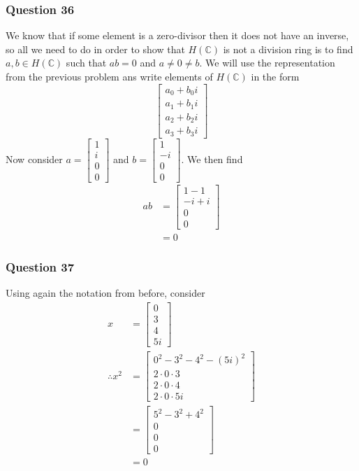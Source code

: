 \documentclass{article}
\begin{document}
\subsubsection{Question 36}
We know that if some element is a zero-divisor then it does not have an inverse, so all we need to do in order to show that $H(\mathbb C)$ is not a division ring is to find $a,b\in H(\mathbb C)$ such that $ab=0$ and $a\not=0\not=b$. We will use the representation from the previous problem ans write elements of $H(\mathbb C)$ in the form \[\left[\begin{matrix}
a_0+b_0i\\
a_1+b_1i\\
a_2+b_2i\\
a_3+b_3i
\end{matrix}\right]\] Now consider $a=\left[\begin{matrix}
1\\i\\0\\0
\end{matrix}\right]$ and $b=\left[\begin{matrix}
1\\-i\\0\\0
\end{matrix}\right]$. We then find 
\begin{align*}
ab&=\left[\begin{matrix}
1-1\\
-i+i\\
0\\
0
\end{matrix}\right]\\
&= 0
\end{align*}

\subsubsection{Question 37}

Using again the notation from before, consider
\begin{align*}
x &= \left[\begin{matrix}
0\\3\\4\\5i
\end{matrix}\right]\\
\therefore x^2&= \left[\begin{matrix}
0^2-3^2-4^2-(5i)^2\\
2\cdot0\cdot3\\
2\cdot0\cdot4\\
2\cdot0\cdot5i
\end{matrix}\right] \\
&= \left[\begin{matrix}
5^2-3^2+4^2\\0\\0\\0
\end{matrix}\right]\\
&= 0
\end{align*}
\end{document}

